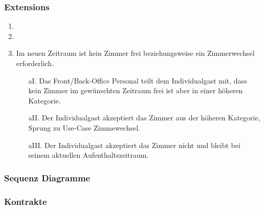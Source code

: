 \documentclass[./detailed_overview_usecases.tex]{subfiles}
\begin{document}
    \subsubsection*{Extensions}
    \begin{enumerate}
        \item 
		\item 
		\item Im neuen Zeitraum ist kein Zimmer frei beziehungsweise ein Zimmerwechsel erforderlich.
        \begin{itemize}
                       \item[aI.] Das Front/Back-Office Personal teilt dem Individualgast mit, dass kein Zimmer im gewünschten Zeitraum frei ist aber in einer höheren Kategorie.
					   \item[aII.] Der Individualgast akzeptiert das Zimmer aus der höheren Kategorie, Sprung zu Use-Case Zimmewechsel.
					   \item[aIII.] Der Individualgast akzeptiert das Zimmer nicht und bleibt bei seinem aktuellen Aufenthaltszeitraum.

        \end{itemize}
    \end{enumerate}

    \subsubsection{Sequenz Diagramme}
    \subsubsection{Kontrakte}
\end{document}
